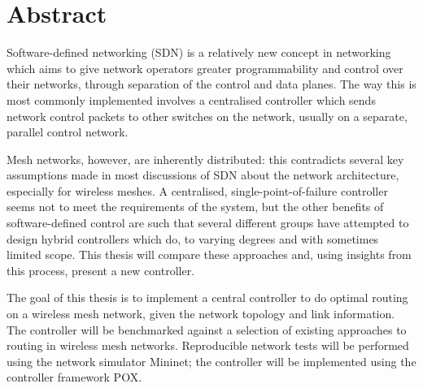 \chapter{Abstract}

Software-defined networking (SDN) is a relatively new concept in networking which aims to give network operators greater programmability and control over their networks, through separation of the control and data planes. The way this is most commonly implemented involves a centralised controller which sends network control packets to other switches on the network, usually on a separate, parallel control network. 

Mesh networks, however, are inherently distributed: this contradicts several key assumptions made in most discussions of SDN about the network architecture, especially for wireless meshes. A centralised, single-point-of-failure controller seems not to meet the requirements of the system, but the other benefits of software-defined control are such that several different groups have attempted to design hybrid controllers which do, to varying degrees and with sometimes limited scope. This thesis will compare these approaches and, using insights from this process, present a new controller.

The goal of this thesis is to implement a central controller to do optimal routing on a wireless mesh network, given the network topology and link information. The controller will be benchmarked against a selection of existing approaches to routing in wireless mesh networks. Reproducible network tests will be performed using the network simulator Mininet; the controller will be implemented using the controller framework POX.
